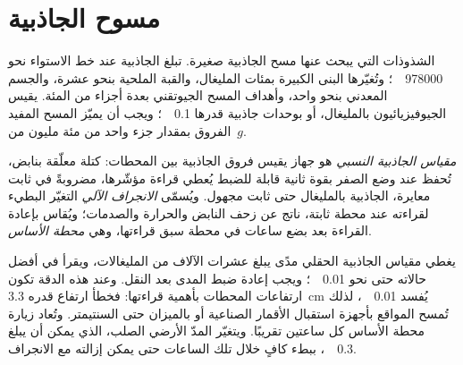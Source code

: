\section{مسوح الجاذبية}\label{sec:b3:field-lab-methods-3:gravity}

الشذوذات التي يبحث عنها مسح الجاذبية صغيرة. تبلغ الجاذبية عند
خط الاستواء نحو \qty{978000}{\milli\gal}؛ وتُغيّرها البنى الكبيرة
بمئات المليغال، والقبة الملحية بنحو عشرة، والجسم المعدني بنحو
واحد، وأهداف المسح الجيوتقني بعدة
أجزاء من المئة. يقيس الجيوفيزيائيون بالمليغال،
أو بوحدات جاذبية قدرها \qty{0.1}{\milli\gal}؛ ويجب أن يميّز المسح المفيد
الفروق بمقدار جزء واحد من مئة مليون من~$g$.

\begin{definition}\label{def:b3:field-lab-methods-3:gravimeter}
\emph{مقياس الجاذبية النسبي} هو
جهاز يقيس فروق الجاذبية بين المحطات: كتلة
معلّقة بنابض، تُحفظ عند وضع الصفر بقوة ثانية قابلة للضبط
يُعطي قراءة مؤشّرها، مضروبةً في ثابت معايرة، الجاذبية
بالمليغال حتى ثابت مجهول. ويُسمّى \emph{
الانجراف الآلي} التغيّر البطيء لقراءته عند
محطة ثابتة، ناتج عن زحف النابض والحرارة والصدمات؛ ويُقاس
بإعادة القراءة بعد بضع ساعات في محطة سبق قراءتها،
وهي \emph{محطة الأساس}.
\end{definition}

يغطي مقياس الجاذبية الحقلي مدًى يبلغ عشرات الآلاف من
المليغالات، ويقرأ في أفضل حالاته حتى نحو \qty{0.01}{\milli\gal}؛ ويجب
إعادة ضبط المدى بعد النقل. وعند هذه الدقة تكون ارتفاعات
المحطات بأهمية قراءتها: فخطأ ارتفاع قدره \qty{3.3}{cm}
يُفسد \qty{0.01}{\milli\gal}، لذلك تُمسح المواقع بأجهزة استقبال
الأقمار الصناعية أو بالميزان حتى السنتيمتر. وتُعاد زيارة محطة الأساس
كل ساعتين تقريبًا. ويتغيّر المدّ الأرضي الصلب، الذي يمكن أن يبلغ
\qty{0.3}{\milli\gal}، ببطء كافٍ خلال تلك الساعات حتى يمكن
إزالته مع الانجراف.


